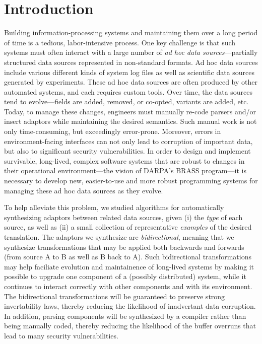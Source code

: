\documentclass[12pt]{article}
\begin{document}
\section{Introduction}

Building information-processing systems and maintaining them over a long
period of time is a tedious, labor-intensive process.  One key challenge is
that such systems must often interact with a large number of
\emph{ad hoc data sources}---partially structured data sources represented
in non-standard formats.  Ad hoc data sources include various
different kinds of system log files as well as scientific data sources
generated by experiments.  These ad hoc data sources are often
produced by other automated systems, and each requires custom tools.
Over time, the data sources tend to evolve---fields are added,
removed, or co-opted, variants are added, etc.  Today, to manage these
changes, engineers must manually re-code parsers and/or insert
adaptors while maintaining the desired semantics.  Such manual work is
not only time-consuming, but exceedingly error-prone.  Moreover,
errors in environment-facing interfaces can not only lead to
corruption of important data, but also to significant security
vulnerabilities.  In order to design and implement survivable,
long-lived, complex software systems that are robust to changes 
in their operational environment---the vision of
DARPA's BRASS program---it is necessary to develop new, easier-to-use
and more robust programming systems for managing these ad hoc data
sources as they evolve.

To help alleviate this problem, we studied algorithms 
for automatically synthesizing adaptors between related data
sources, given (i) the \emph{type} of each
source, as well as (ii) a small collection of
representative \emph{examples} of the desired translation.  The
adaptors we synthesize are \emph{bidirectional}, meaning
that we synthesize transformations that may be applied both
backwards and forwards (from source A to B as well as B back to A).
Such bidirectional transformations may help faciliate evolution and
maintainence of long-lived systems by making it possible to upgrade
one component of a (possibly distributed) system, while it continues
to interact correctly with other components and with its environment.
The bidirectional transformations will be guaranteed to preserve
strong invertability laws, thereby reducing the likelihood of
inadvertant data corruption.  In addition, parsing components
will be synthesized by a compiler rather than being manually coded,
thereby reducing the likelihood of the buffer overruns that lead to
many security vulnerabilities.
\end{document}
